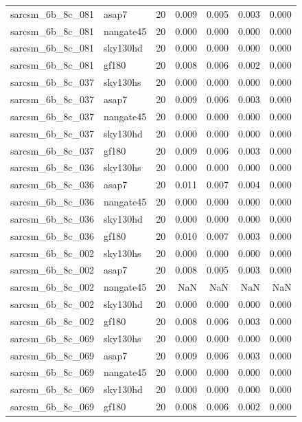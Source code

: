 \begin{tabular}{llrrrrr}
sarcsm\_6b\_8c\_081 & asap7 & 20 & 0.009 & 0.005 & 0.003 & 0.000 \\
sarcsm\_6b\_8c\_081 & nangate45 & 20 & 0.000 & 0.000 & 0.000 & 0.000 \\
sarcsm\_6b\_8c\_081 & sky130hd & 20 & 0.000 & 0.000 & 0.000 & 0.000 \\
sarcsm\_6b\_8c\_081 & gf180 & 20 & 0.008 & 0.006 & 0.002 & 0.000 \\
sarcsm\_6b\_8c\_037 & sky130hs & 20 & 0.000 & 0.000 & 0.000 & 0.000 \\
sarcsm\_6b\_8c\_037 & asap7 & 20 & 0.009 & 0.006 & 0.003 & 0.000 \\
sarcsm\_6b\_8c\_037 & nangate45 & 20 & 0.000 & 0.000 & 0.000 & 0.000 \\
sarcsm\_6b\_8c\_037 & sky130hd & 20 & 0.000 & 0.000 & 0.000 & 0.000 \\
sarcsm\_6b\_8c\_037 & gf180 & 20 & 0.009 & 0.006 & 0.003 & 0.000 \\
sarcsm\_6b\_8c\_036 & sky130hs & 20 & 0.000 & 0.000 & 0.000 & 0.000 \\
sarcsm\_6b\_8c\_036 & asap7 & 20 & 0.011 & 0.007 & 0.004 & 0.000 \\
sarcsm\_6b\_8c\_036 & nangate45 & 20 & 0.000 & 0.000 & 0.000 & 0.000 \\
sarcsm\_6b\_8c\_036 & sky130hd & 20 & 0.000 & 0.000 & 0.000 & 0.000 \\
sarcsm\_6b\_8c\_036 & gf180 & 20 & 0.010 & 0.007 & 0.003 & 0.000 \\
sarcsm\_6b\_8c\_002 & sky130hs & 20 & 0.000 & 0.000 & 0.000 & 0.000 \\
sarcsm\_6b\_8c\_002 & asap7 & 20 & 0.008 & 0.005 & 0.003 & 0.000 \\
sarcsm\_6b\_8c\_002 & nangate45 & 20 & NaN & NaN & NaN & NaN \\
sarcsm\_6b\_8c\_002 & sky130hd & 20 & 0.000 & 0.000 & 0.000 & 0.000 \\
sarcsm\_6b\_8c\_002 & gf180 & 20 & 0.008 & 0.006 & 0.003 & 0.000 \\
sarcsm\_6b\_8c\_069 & sky130hs & 20 & 0.000 & 0.000 & 0.000 & 0.000 \\
sarcsm\_6b\_8c\_069 & asap7 & 20 & 0.009 & 0.006 & 0.003 & 0.000 \\
sarcsm\_6b\_8c\_069 & nangate45 & 20 & 0.000 & 0.000 & 0.000 & 0.000 \\
sarcsm\_6b\_8c\_069 & sky130hd & 20 & 0.000 & 0.000 & 0.000 & 0.000 \\
sarcsm\_6b\_8c\_069 & gf180 & 20 & 0.008 & 0.006 & 0.002 & 0.000 \\

\end{tabular}
